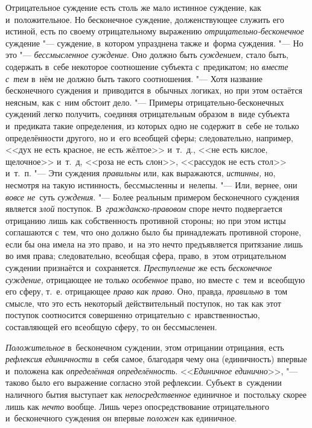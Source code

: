 Отрицательное суждение есть столь же мало истинное суждение,
как и~положительное. Но бесконечное суждение, долженствующее служить его
истиной, есть по своему отрицательному выражению {\em отрицательно-бесконечное}
суждение "--- суждение, в~котором упразднена также и~форма суждения. "--- Но
это "--- {\em бессмысленное суждение}. Оно должно быть {\em суждением,} стало
быть, содержать в~себе некоторое соотношение субъекта с~предикатом; но
{\em вместе с~тем} в~нём не должно быть такого соотношения. "--- Хотя название
бесконечного суждения и~приводится в~обычных логиках, но при этом остаётся
неясным, как с~ним обстоит дело. "--- Примеры
отрицательно-бесконечных суждений легко получить, соединяя отрицательным
образом в~виде субъекта и~предиката такие определения, из которых одно не
содержит в~себе не только определённости другого, но и~его всеобщей сферы;
следовательно, например, <<дух не есть красное, не есть жёлтое>> и~т.~д., <<не
есть кислое, щелочное>> и~т.~д, <<роза не есть слон>>, <<рассудок не есть
стол>> и~т.~п. "--- Эти суждения {\em правильны} или, как выражаются,
{\em истинны,} но, несмотря на такую истинность, бессмысленны и~нелепы. "---
Или, вернее, они {\em вовсе не}~суть {\em суждения}. "--- Более
реальным примером бесконечного суждения является
{\em злой} поступок. В~{\em гражданско-правовом}
споре нечто подвергается отрицанию лишь как собственность
противной стороны; но при этом истцы соглашаются с~тем, что оно должно было
бы принадлежать противной стороне, если бы она имела на это право, и~на это
нечто предъявляется притязание лишь во имя права; следовательно, всеобщая
сфера, право, в~этом отрицательном суждении признаётся и~сохраняется.
{\em Преступление} же есть {\em бесконечное суждение,} отрицающее не только
{\em особенное} право, но вместе с~тем и~всеобщую его сферу, т.~е. отрицающее
{\em право как право}. Оно, правда, {\em правильно} в~том
смысле, что это есть некоторый действительный поступок, но так как этот
поступок соотносится совершенно отрицательно с~нравственностью,
составляющей его всеобщую сферу, то он бессмысленен.

{\em Положительное} в~бесконечном суждении, этом отрицании отрицания, есть
{\em рефлексия единичности} в~себя самое, благодаря чему она (единичность)
впервые и~положена как {\em определённая определённость}.
<<{\em Единичное единично}>>, "--- таково было его выражение согласно этой
рефлексии. Субъект в~суждении наличного бытия выступает как
{\em непосредственное} единичное и~постольку скорее лишь как {\em нечто}
вообще. Лишь через опосредствование отрицательного и~бесконечного суждения
он впервые {\em положен} как единичное.

